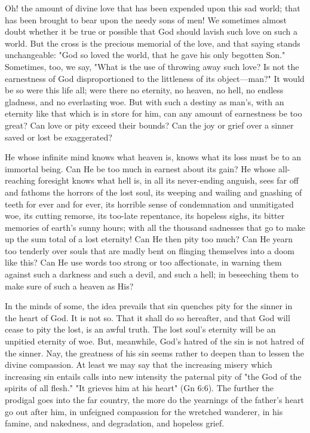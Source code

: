 \documentclass[
]{book}
\begin{document}
Oh! the amount of divine love that has been expended upon this sad world; that has been brought to bear upon the needy sons of men! We sometimes almost doubt whether it be true or possible that God should lavish such love on such a world. But the cross is the precious memorial of the love, and that saying stands unchangeable: "God so loved the world, that he gave his only begotten Son." Sometimes, too, we say, "What is the use of throwing away such love? Is not the earnestness of God disproportioned to the littleness of its object---man?" It would be so were this life all; were there no eternity, no heaven, no hell, no endless gladness, and no everlasting woe. But with such a destiny as man's, with an eternity like that which is in store for him, can any amount of earnestness be too great? Can love or pity exceed their bounds? Can the joy or grief over a sinner saved or lost be exaggerated?

He whose infinite mind knows what heaven is, knows what its loss must be to an immortal being. Can He be too much in earnest about its gain? He whose all-reaching foresight knows what hell is, in all its never-ending anguish, sees far off and fathoms the horrors of the lost soul, its weeping and wailing and gnashing of teeth for ever and for ever, its horrible sense of condemnation and unmitigated woe, its cutting remorse, its too-late repentance, its hopeless sighs, its bitter memories of earth's sunny hours; with all the thousand sadnesses that go to make up the sum total of a lost eternity! Can He then pity too much? Can He yearn too tenderly over souls that are madly bent on flinging themselves into a doom like this? Can He use words too strong or too affectionate, in warning them against such a darkness and such a devil, and such a hell; in beseeching them to make sure of such a heaven as His?

In the minds of some, the idea prevails that sin quenches pity for the sinner in the heart of God. It is not so. That it shall do so hereafter, and that God will cease to pity the lost, is an awful truth. The lost soul's eternity will be an unpitied eternity of woe. But, meanwhile, God's hatred of the sin is not hatred of the sinner. Nay, the greatness of his sin seems rather to deepen than to lessen the divine compassion. At least we may say that the increasing misery which increasing sin entails calls into new intensity the paternal pity of "the God of the spirits of all flesh." "It grieves him at his heart" (Gn 6:6). The further the prodigal goes into the far country, the more do the yearnings of the father's heart go out after him, in unfeigned compassion for the wretched wanderer, in his famine, and nakedness, and degradation, and hopeless grief.
\end{document}

